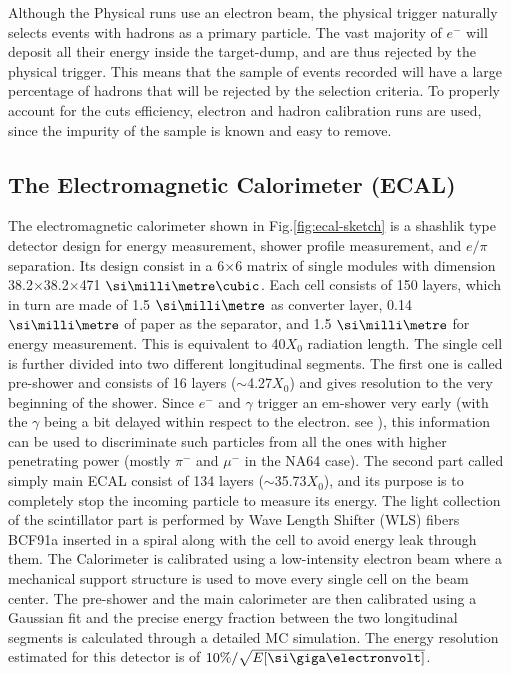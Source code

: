Although the Physical runs use an electron beam, the physical trigger naturally selects events with hadrons as a primary particle. The vast majority of $e^-$ will deposit all their energy inside the target-dump, and are thus rejected by the physical trigger. This means that the sample of events recorded will have a large percentage of hadrons that will be rejected by the selection criteria. To properly account for the cuts efficiency, electron and hadron calibration runs are used, since the impurity of the sample is known and easy to remove.

\subsection{The Electromagnetic Calorimeter (ECAL)}
\label{ch2:sec:detectors-ecal}

The electromagnetic calorimeter shown in Fig.\ref{fig:ecal-sketch} is a shashlik type detector design for energy measurement, shower profile measurement, and $e/\pi$ separation. Its design consist in a 6$\times$6 matrix of single modules with dimension 38.2$\times$38.2$\times$471 $\mmc$. Each cell consists of 150 layers, which in turn are made of 1.5 $\mmi$ as converter layer, 0.14 $\mmi$ of paper as the separator, and 1.5 $\mmi$ for energy measurement. This is equivalent to 40$X_0$ radiation length. The single cell is further divided into two different longitudinal segments. The first one is called pre-shower and consists of 16 layers ($\sim$4.27$X_0$) and gives resolution to the very beginning of the shower. Since $e^-$ and $\gamma$ trigger an em-shower very early (with the $\gamma$ being a bit delayed within respect to the electron. see \cite{Bichsel:2002cf}), this information can be used to discriminate such particles from all the ones with higher penetrating power (mostly $\pi^-$ and $\mu^-$ in the NA64 case). The second part called simply main ECAL consist of 134 layers ($\sim$35.73$X_0$), and its purpose is to completely stop the incoming particle to measure its energy. The light collection of the scintillator part is performed by Wave Length Shifter (WLS) fibers BCF91a \cite{wls-fibers} inserted in a spiral along with the cell to avoid energy leak through them. The Calorimeter is calibrated using a low-intensity electron beam where a mechanical support structure is used to move every single cell on the beam center. The pre-shower and the main calorimeter are then calibrated using a Gaussian fit and the precise energy fraction between the two longitudinal segments is calculated through a detailed MC simulation. The energy resolution estimated for this detector is of $10\% / \sqrt{E[\gev]}$.

